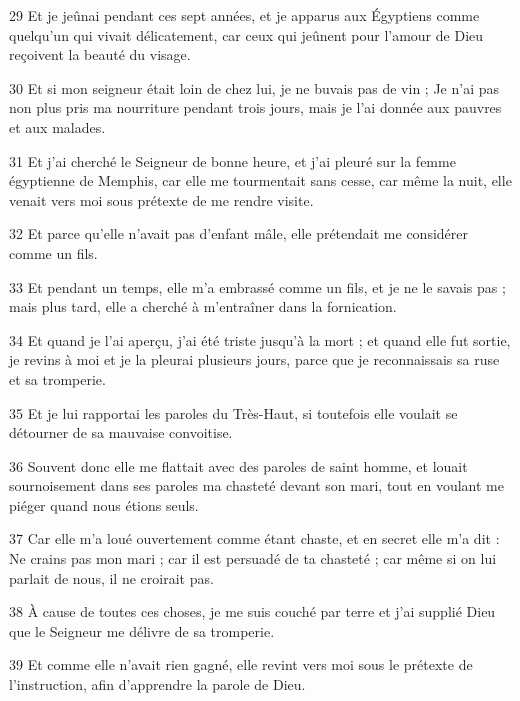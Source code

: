 \par 29 Et je jeûnai pendant ces sept années, et je apparus aux Égyptiens comme quelqu'un qui vivait délicatement, car ceux qui jeûnent pour l'amour de Dieu reçoivent la beauté du visage.

\par 30 Et si mon seigneur était loin de chez lui, je ne buvais pas de vin ; Je n'ai pas non plus pris ma nourriture pendant trois jours, mais je l'ai donnée aux pauvres et aux malades.

\par 31 Et j'ai cherché le Seigneur de bonne heure, et j'ai pleuré sur la femme égyptienne de Memphis, car elle me tourmentait sans cesse, car même la nuit, elle venait vers moi sous prétexte de me rendre visite.

\par 32 Et parce qu'elle n'avait pas d'enfant mâle, elle prétendait me considérer comme un fils.

\par 33 Et pendant un temps, elle m'a embrassé comme un fils, et je ne le savais pas ; mais plus tard, elle a cherché à m'entraîner dans la fornication.

\par 34 Et quand je l'ai aperçu, j'ai été triste jusqu'à la mort ; et quand elle fut sortie, je revins à moi et je la pleurai plusieurs jours, parce que je reconnaissais sa ruse et sa tromperie.

\par 35 Et je lui rapportai les paroles du Très-Haut, si toutefois elle voulait se détourner de sa mauvaise convoitise.

\par 36 Souvent donc elle me flattait avec des paroles de saint homme, et louait sournoisement dans ses paroles ma chasteté devant son mari, tout en voulant me piéger quand nous étions seuls.

\par 37 Car elle m'a loué ouvertement comme étant chaste, et en secret elle m'a dit : Ne crains pas mon mari ; car il est persuadé de ta chasteté ; car même si on lui parlait de nous, il ne croirait pas.

\par 38 À cause de toutes ces choses, je me suis couché par terre et j'ai supplié Dieu que le Seigneur me délivre de sa tromperie.

\par 39 Et comme elle n'avait rien gagné, elle revint vers moi sous le prétexte de l'instruction, afin d'apprendre la parole de Dieu.


